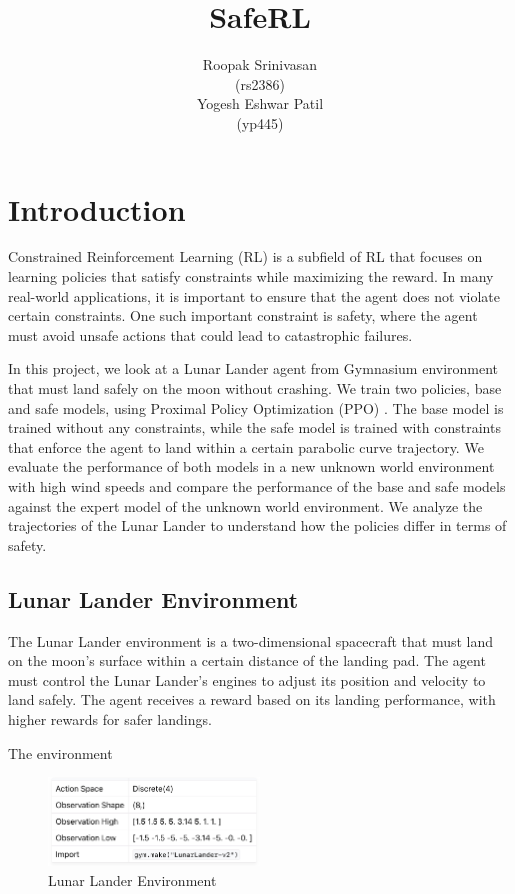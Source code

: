 \documentclass{article}
\title{SafeRL}
\author{%
  Roopak Srinivasan \\
  (rs2386)\\
  \And
  Yogesh Eshwar Patil \\
  (yp445) \\
}
\begin{document}
\maketitle


\section{Introduction}
Constrained Reinforcement Learning (RL) is a subfield of RL that focuses on learning policies that satisfy constraints while maximizing the reward. In many real-world applications, it is important to ensure that the agent does not violate certain constraints. One such important constraint is safety, where the agent must avoid unsafe actions that could lead to catastrophic failures.

In this project, we look at a Lunar Lander agent from Gymnasium environment \cite{lunar_lander_gym} that must land safely on the moon without crashing. We train two policies, base and safe models, using Proximal Policy Optimization (PPO) \cite{schulman2017proximal}. The base model is trained without any constraints, while the safe model is trained with constraints that enforce the agent to land within a certain parabolic curve trajectory. We evaluate the performance of both models in a new unknown world environment with high wind speeds and compare the performance of the base and safe models against the expert model of the unknown world environment. We analyze the trajectories of the Lunar Lander to understand how the policies differ in terms of safety.

\subsection{Lunar Lander Environment}
The Lunar Lander environment is a two-dimensional spacecraft that must land on the moon's surface within a certain distance of the landing pad. The agent must control the Lunar Lander's engines to adjust its position and velocity to land safely. The agent receives a reward based on its landing performance, with higher rewards for safer landings.

The environment 
\begin{figure}[h]
  \centering
  \includegraphics[width=0.5\textwidth]{lunar_lander_table.png}
  \caption{Lunar Lander Environment}
  \label{fig:environment_table}
\end{figure}
\end{document}
